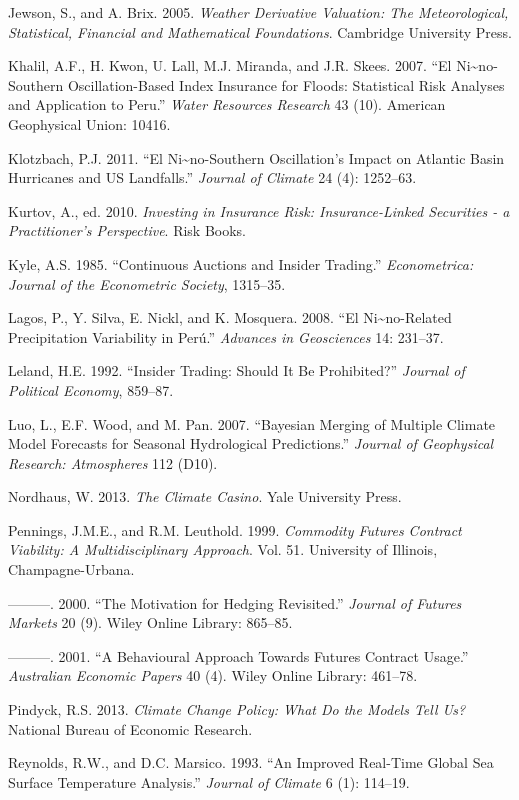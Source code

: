 \documentclass[article]{jss}
\begin{document}
Jewson, S., and A. Brix. 2005. \emph{Weather Derivative Valuation: The
Meteorological, Statistical, Financial and Mathematical Foundations}.
Cambridge University Press.

Khalil, A.F., H. Kwon, U. Lall, M.J. Miranda, and J.R. Skees. 2007. ``El
Ni\textasciitilde{}no-Southern Oscillation-Based Index Insurance for
Floods: Statistical Risk Analyses and Application to Peru.'' \emph{Water
Resources Research} 43 (10). American Geophysical Union: 10416.

Klotzbach, P.J. 2011. ``El Ni\textasciitilde{}no-Southern Oscillation's
Impact on Atlantic Basin Hurricanes and US Landfalls.'' \emph{Journal of
Climate} 24 (4): 1252--63.

Kurtov, A., ed. 2010. \emph{Investing in Insurance Risk:
Insurance-Linked Securities - a Practitioner's Perspective}. Risk Books.

Kyle, A.S. 1985. ``Continuous Auctions and Insider Trading.''
\emph{Econometrica: Journal of the Econometric Society}, 1315--35.

Lagos, P., Y. Silva, E. Nickl, and K. Mosquera. 2008. ``El
Ni\textasciitilde{}no-Related Precipitation Variability in Perú.''
\emph{Advances in Geosciences} 14: 231--37.

Leland, H.E. 1992. ``Insider Trading: Should It Be Prohibited?''
\emph{Journal of Political Economy}, 859--87.

Luo, L., E.F. Wood, and M. Pan. 2007. ``Bayesian Merging of Multiple
Climate Model Forecasts for Seasonal Hydrological Predictions.''
\emph{Journal of Geophysical Research: Atmospheres} 112 (D10).

Nordhaus, W. 2013. \emph{The Climate Casino}. Yale University Press.

Pennings, J.M.E., and R.M. Leuthold. 1999. \emph{Commodity Futures
Contract Viability: A Multidisciplinary Approach}. Vol. 51. University
of Illinois, Champagne-Urbana.

---------. 2000. ``The Motivation for Hedging Revisited.'' \emph{Journal
of Futures Markets} 20 (9). Wiley Online Library: 865--85.

---------. 2001. ``A Behavioural Approach Towards Futures Contract
Usage.'' \emph{Australian Economic Papers} 40 (4). Wiley Online Library:
461--78.

Pindyck, R.S. 2013. \emph{Climate Change Policy: What Do the Models Tell
Us?} National Bureau of Economic Research.

Reynolds, R.W., and D.C. Marsico. 1993. ``An Improved Real-Time Global
Sea Surface Temperature Analysis.'' \emph{Journal of Climate} 6 (1):
114--19.
\end{document}
